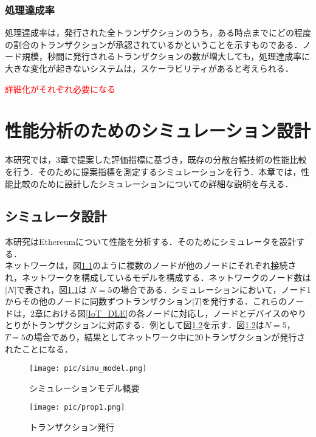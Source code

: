 \documentclass[japanese, macos]{KU2}
\begin{document}
\subsection{処理達成率}
処理達成率は，発行された全トランザクションのうち，ある時点までにどの程度の割合のトランザクションが承認されているかということを示すものである．ノード規模，秒間に発行されるトランザクションの数が増大しても，処理達成率に大きな変化が起きないシステムは，スケーラビリティがあると考えられる．

\textcolor{red}{詳細化がそれぞれ必要になる}


\chapter{性能分析のためのシミュレーション設計}
本研究では，3章で提案した評価指標に基づき，既存の分散台帳技術の性能比較を行う．そのために提案指標を測定するシミュレーションを行う．本章では，性能比較のために設計したシミュレーションについての詳細な説明を与える．

\section{シミュレータ設計}
本研究はEthereumについて性能を分析する．そのためにシミュレータを設計する．\\
ネットワークは，図\ref{fig:simu_model}のように複数のノードが他のノードにそれぞれ接続され，ネットワークを構成しているモデルを構成する．ネットワークのノード数は$|N|$で表され，図\ref{fig:simu_model}は $N = 5$の場合である．シミュレーションにおいて，ノード1からその他のノードに同数ずつトランザクション$|T|$を発行する．これらのノードは，2章における図\ref{IoT_DLE}の各ノードに対応し，ノードとデバイスのやりとりがトランザクションに対応する．例として図\ref{fig:prop1}を示す．図\ref{fig:prop1}は$N = 5$，$T = 5$の場合であり，結果としてネットワーク中に20トランザクションが発行されたことになる．\\

\begin{figure}[htbp]
  \begin{center} 
    \texttt{[image: pic/simu\_model.png]}
    \caption{シミュレーションモデル概要}
    \label{fig:simu_model} 
  \end{center}
\end{figure}

\begin{figure}[htbp]
  \begin{center} 
   \texttt{[image: pic/prop1.png]}
    \caption{トランザクション発行}
    \label{fig:prop1} 
  \end{center}
\end{figure}
\end{document}
